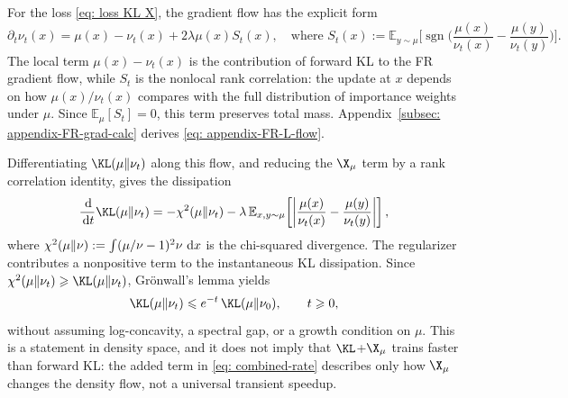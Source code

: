 \documentclass{article}
\begin{document}
For the loss \eqref{eq: loss KL X}, the gradient flow has the explicit form
\begin{equation}
    \partial_t\nu_t(x) = \mu(x) - \nu_t(x) + 2\lambda \mu(x) S_t(x), \quad
    \text{where~}
    S_t(x) := \mathbb E_{y\sim\mu}\biggl[\operatorname{sgn}\biggl(\frac{\mu(x)}{\nu_t(x)} - \frac{\mu(y)}{\nu_t(y)}\biggr)\biggr].
    \label{eq: appendix-FR-L-flow}
\end{equation}
The local term $\mu(x)-\nu_t(x)$ is the contribution of forward KL to the FR gradient flow, while $S_t$ is the nonlocal rank correlation: the update at $x$ depends on how $\mu(x)/\nu_t(x)$ compares with the full distribution of importance weights under $\mu$. Since $\mathbb E_\mu[S_t]=0$, this term preserves total mass. Appendix~\ref{subsec: appendix-FR-grad-calc} derives \eqref{eq: appendix-FR-L-flow}.

Differentiating $\KL(\mu\|\nu_t)$ along this flow, and reducing the $\X_\mu$ term by a rank correlation identity, gives the dissipation
\begin{equation}
    \frac{\D}{\D t}\KL(\mu\|\nu_t) = -\chi^2(\mu\|\nu_t) - \lambda\, \mathbb E_{x,y\sim\mu}\!\left[ \left|\frac{\mu(x)}{\nu_t(x)} - \frac{\mu(y)}{\nu_t(y)}\right| \right],
    \label{eq: combined-rate}
\end{equation}
where $\chi^2(\mu\|\nu):=\int(\mu/\nu-1)^2\nu\,\,\mathrm d x$ is the chi-squared divergence. The regularizer contributes a nonpositive term to the instantaneous KL dissipation. Since $\chi^2(\mu\|\nu_t) \Ge \KL(\mu\|\nu_t)$, Gr\"onwall's lemma yields
\begin{equation}
    \KL(\mu\|\nu_t) \Le e^{-t}\,\KL(\mu\|\nu_0), \qquad t \Ge 0,
    \label{eq: KL-exponential}
\end{equation}
without assuming log-concavity, a spectral gap, or a growth condition on $\mu$. This is a statement in density space, and it does not imply that $\KL$+$\X_\mu$ trains faster than forward KL: the added term in \eqref{eq: combined-rate} describes only how $\X_\mu$ changes the density flow, not a universal transient speedup.
\end{document}

